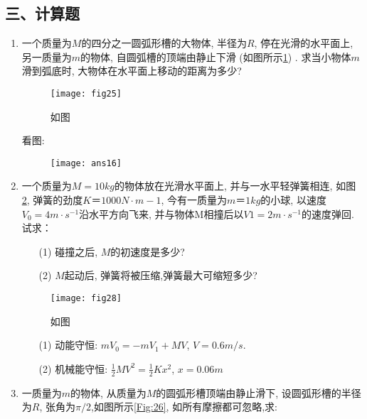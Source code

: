 \subsection*{三、计算题}
\begin{enumerate}
    \item 一个质量为$M$的四分之一圆弧形槽的大物体, 半径为$R$, 停在光滑的水平面上, 另一质量为$m$的物体, 自圆弧槽的顶端由静止下滑 (如图所示\ref{Fig:25}) .
    求当小物体$m$滑到弧底时, 大物体在水平面上移动的距离为多少?
    \begin{figure}[H]
        \centering
        \texttt{[image: fig25]}
            \caption{如图}\label{Fig:25}
    \end{figure}
    \begin{solution}
        看图: 
        \begin{figure}[H]
            \centering
            \texttt{[image: ans16]}
        \end{figure}
    \end{solution}
    \item 一个质量为$M=10kg$的物体放在光滑水平面上, 并与一水平轻弹簧相连, 如图\ref{Fig:28}, 弹簧的劲度$K＝1000N·m-1$, 今有一质量为$m＝1kg$的小球, 
    以速度$V_0=4m\cdot s^{-1}$沿水平方向飞来, 并与物体M相撞后以$V1=2m\cdot s^{-1}$的速度弹回.试求：
    \begin{enumerate}
        \item[(1)] 碰撞之后, $M$的初速度是多少?
        \item[(2)] $M$起动后, 弹簧将被压缩,弹簧最大可缩短多少?
    \end{enumerate}
        \begin{figure}[H]
            \centering
            \texttt{[image: fig28]}
                \caption{如图}\label{Fig:28}
        \end{figure}
        \begin{solution}
            \begin{enumerate}
                \item[(1)] 动能守恒: $mV_0=-mV_1 + MV$, $V=0.6 m/s$.
                \item[(2)] 机械能守恒: $\frac{1}{2}MV^2 = \frac{1}{2}Kx^2$, $x=0.06 m$
            \end{enumerate}
        \end{solution}
     \item 一质量为$m$的物体, 从质量为$M$的圆弧形槽顶端由静止滑下, 设圆弧形槽的半径为$R$, 张角为$\pi/2$,如图所示\ref{Fig:26}, 如所有摩擦都可忽略,求:
    \begin{enumerate}
            

\end{enumerate}
\end{enumerate}
